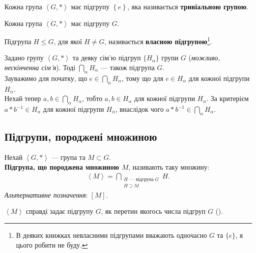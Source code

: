 \documentclass{math_library}
\begin{document}
\begin{remark}
Кожна група $\left<G, *\right>$ має підгрупу $\left\{e\right\}$, яка називається \textbf{тривіальною групою}.
\end{remark}

\begin{remark}
Кожна група $\left<G, *\right>$ має підгрупу $G$.
\end{remark}

\begin{definition}
Підгрупа $H \leq G$, для якої $H \neq G$, називається \textbf{власною підгрупою}\footnote{В деяких книжках невласними підгрупами вважають одночасно $G$ та $\{e\}$, я цього робити не буду.}.
\end{definition}

\begin{example}
\label{intersection_of_subgroups_is_a_subgroup}
Задано групу $\left< G,*\right>$ та деяку сім'ю підгруп $\{H_\alpha\}$ групи $G$ (\textit{можливо, нескінченна сім'я}). Тоді $\displaystyle\bigcap_{\alpha} H_\alpha$ --- також підгрупа $G$.
\bigskip \\
Зауважимо для початку, що $e \in \displaystyle\bigcap_{\alpha} H_\alpha$, тому що для $e \in H_\alpha$ для кожної підгрупи $H_\alpha$.\\
Нехай тепер $a,b \in \displaystyle\bigcap_{\alpha} H_\alpha$, тобто $a,b \in H_\alpha$ для кожної підгрупи $H_\alpha$. За критерієм $a*b^{-1} \in H_\alpha$ для кожної підгрупи $H_\alpha$, внаслідок чого $a*b^{-1} \in \displaystyle\bigcap_{\alpha} H_\alpha$.
\end{example}

\subsection{Підгрупи, породжені множиною}
\begin{definition}
Нехай $\left< G, *\right>$ --- група та $M \subset G$.\\
\textbf{Підгрупа, що породжена множиною $M$}, називають таку множину:
\begin{align*}
\left<M\right> = \bigcap_{\substack{H \text{ --- підгрупа }G \\ H \supset M}} H.
\end{align*}
\textit{Альтернативне позначення}: $\left[ M \right]$.
\end{definition}

\begin{remark}
$\left<M\right>$ справді задає підгрупу $G$, як перетин якогось числа підгруп $G$ ().
\end{remark}
\end{document}
